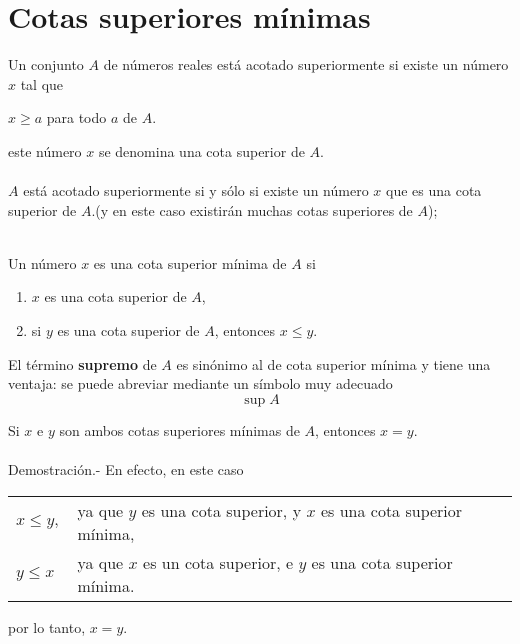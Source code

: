 \chapter{Cotas superiores mínimas}

    \begin{def.}
	Un conjunto $A$ de números reales está acotado superiormente si existe un número $x$ tal que 
	\begin{center}
	    $x\geq a$ para todo $a$ de $A$.
	\end{center}
	este número $x$ se denomina una cota superior de $A$.\\\\
    $A$ está acotado superiormente si y sólo si existe un número $x$ que es una cota superior de $A$.(y en este caso existirán muchas cotas superiores de $A$);\\\\
    \end{def.}

    \begin{def.}
	Un número $x$ es una cota superior mínima de $A$ si
	\begin{enumerate}[\bfseries (1)]
	    \item $x$ es una cota superior de $A$,
	    \item si $y$ es una cota superior de $A$, entonces $x\leq y$.
	\end{enumerate}
	El término \textbf{supremo} de $A$ es sinónimo al de cota superior mínima y tiene una ventaja: se puede abreviar mediante un símbolo muy adecuado
	$$\sup A$$
    \end{def.}
\vspace{0.2cm}

    Si $x$ e $y$ son ambos cotas superiores mínimas de $A$, entonces $x=y$.\\\\
	Demostración.-\; En efecto, en este caso
	\begin{center}
	\begin{tabular}{ll}
	    $x\leq y,$ & ya que $y$ es una cota superior, y $x$ es una cota superior mínima,\\
	    $y\leq x$ & ya que $x$ es un cota superior, e $y$ es una cota superior mínima.
	\end{tabular}
	\end{center}
	por lo tanto, $x=y$. \\\\


